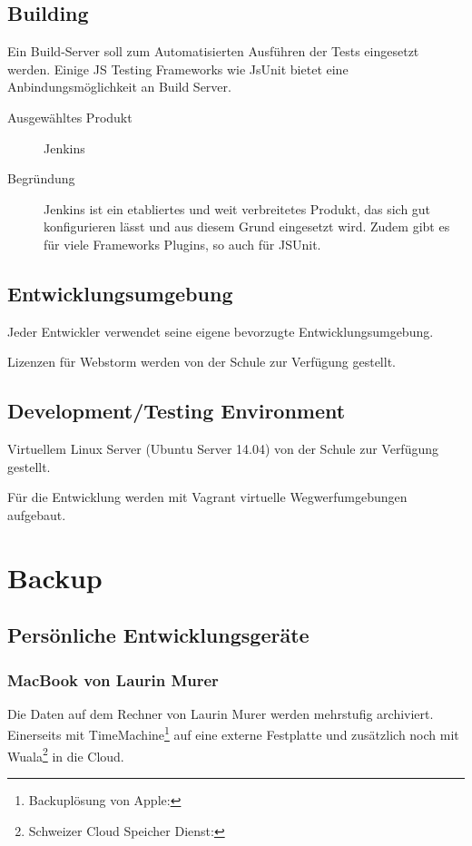 


		\subsection{Building}
			Ein Build-Server soll zum Automatisierten Ausführen der Tests eingesetzt werden.
			Einige JS Testing Frameworks wie JsUnit bietet eine Anbindungsmöglichkeit an Build Server.
			
			\begin{description}
				\item[Ausgewähltes Produkt] Jenkins
				\item[Begründung]  Jenkins ist ein etabliertes und weit verbreitetes Produkt, 
					das sich gut konfigurieren lässt und aus diesem Grund eingesetzt wird.
					Zudem gibt es für viele Frameworks Plugins, so auch für JSUnit.
			\end{description}


		\subsection{Entwicklungsumgebung}
			Jeder Entwickler verwendet seine eigene bevorzugte Entwicklungsumgebung. 
			
			Lizenzen für Webstorm werden von der Schule zur Verfügung gestellt.


		\subsection{Development/Testing Environment}
			Virtuellem Linux Server (Ubuntu Server 14.04) von der Schule zur Verfügung gestellt.
			
			Für die Entwicklung werden mit Vagrant virtuelle Wegwerfumgebungen aufgebaut.


	\section{Backup}
		\subsection{Persönliche Entwicklungsgeräte}
			\subsubsection{MacBook von Laurin Murer}\label{backupLaurin}
				Die Daten auf dem Rechner von Laurin Murer werden mehrstufig archiviert.
				Einerseits mit TimeMachine\footnote{Backuplösung von Apple: } auf eine externe Festplatte und zusätzlich noch mit Wuala\footnote{Schweizer Cloud Speicher Dienst: } in die Cloud.

